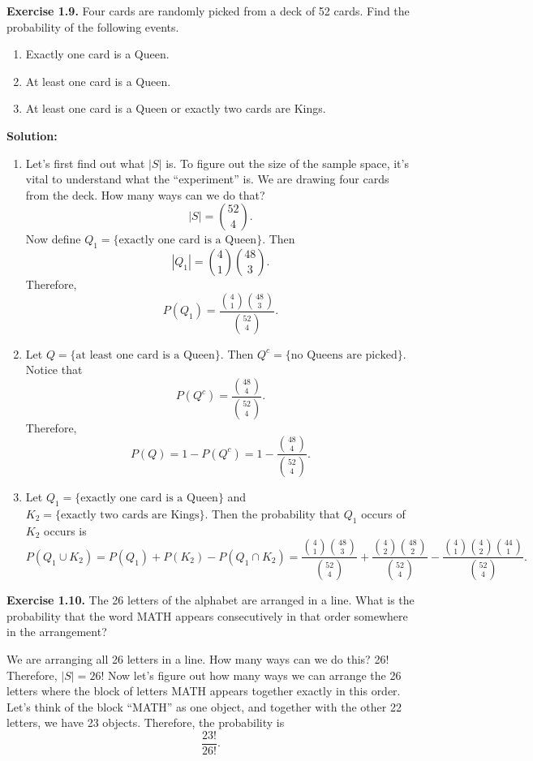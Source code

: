 \documentclass[
  12pt,
]{krantzNoCorner}
\providecommand{\tightlist}{%
  \setlength{\itemsep}{0pt}\setlength{\parskip}{0pt}}
\begin{document}
\textbf{Exercise 1.9.} Four cards are randomly picked from a deck of 52
cards. Find the probability of the following events.

\begin{enumerate}
\def\labelenumi{\arabic{enumi}.}
\item
  Exactly one card is a Queen.
\item
  At least one card is a Queen.
\item
  At least one card is a Queen or exactly two cards are Kings.
\end{enumerate}

\textbf{Solution:}

\begin{enumerate}
\def\labelenumi{\arabic{enumi}.}
\tightlist
\item
  Let's first find out what \(|S|\) is. To figure out the size of the
  sample space, it's vital to understand what the ``experiment'' is. We
  are drawing four cards from the deck. How many ways can we do that?
  \[|S|=\binom{52}{4}.\] Now define
  \(Q_1 = \{\text{exactly one card is a Queen}\}\). Then
  \[|Q_1|=\binom{4}{1}\binom{48}{3}.\] Therefore,
  \[P(Q_1)=\frac{\binom{4}{1}\binom{48}{3}}{\binom{52}{4}}.\]
\item
  Let \(Q=\{\text{at least one card is a Queen}\}.\) Then
  \(Q^c=\{\text{no Queens are picked}\}.\) Notice that
  \[P(Q^c)=\frac{\binom{48}{4}}{\binom{52}{4}}.\]
  Therefore,\[P(Q)=1-P(Q^c)=1-\frac{\binom{48}{4}}{\binom{52}{4}}.\]
\item
  Let \(Q_1 = \{\text{exactly one card is a Queen}\}\) and
  \(K_2 = \{\text{exactly two cards are Kings}\}.\) Then the probability
  that \(Q_1\) occurs of \(K_2\) occurs is
  \[P(Q_1\cup K_2)=P(Q_1)+P(K_2)-P(Q_1\cap K_2)=\frac{\binom{4}{1}\binom{48}{3}}{\binom{52}{4}}+\frac{\binom{4}{2}\binom{48}{2}}{\binom{52}{4}}-\frac{\binom{4}{1}\binom{4}{2}\binom{44}{1}}{\binom{52}{4}}.\]
\end{enumerate}

\textbf{Exercise 1.10.} The 26 letters of the alphabet are arranged in a
line. What is the probability that the word MATH appears consecutively
in that order somewhere in the arrangement?

We are arranging all 26 letters in a line. How many ways can we do this?
26! Therefore, \(|S|=26!\) Now let's figure out how many ways we can
arrange the 26 letters where the block of letters MATH appears together
exactly in this order. Let's think of the block ``MATH'' as one object,
and together with the other 22 letters, we have 23 objects. Therefore,
the probability is \[\frac{23!}{26!}.\]
\end{document}
